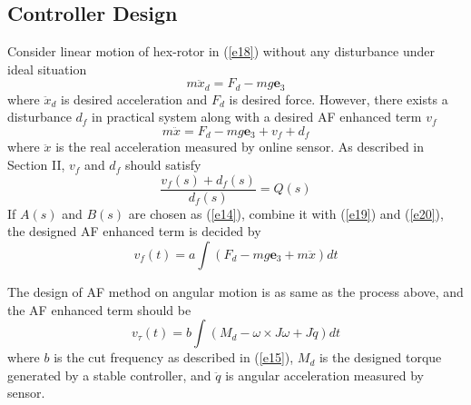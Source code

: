 \documentclass[letterpaper, 10 pt, conference]{ieeeconf}  %
\begin{document}
\subsection{Controller Design}

Consider linear motion of hex-rotor in (\ref{e18}) without any disturbance under ideal situation
\begin{equation}
    m\ddot{x}_d = F_d - mg\bm{e}_3
    \label{e19}
\end{equation}
where $\ddot{x}_d$ is desired acceleration and $F_d$ is desired force. However, there exists a disturbance $d_f$ in practical system along with a desired AF enhanced term $v_f$
\begin{equation}
    m\ddot{x} = F_d - mg\bm{e}_3 + v_f + d_f
    \label{e20}
\end{equation}
where $\ddot{x}$ is the real acceleration measured by online sensor.
As described in Section II, $v_f$ and $d_f$ should satisfy
\begin{equation}
    \frac{v_f(s)+d_f(s)}{d_f(s)} = Q(s)
    \label{e21}
\end{equation}
If $A(s)$ and $B(s)$ are chosen as (\ref{e14}), combine it with (\ref{e19}) and (\ref{e20}), the designed AF enhanced term is decided by
\begin{equation}
    v_f(t) = a\int (F_d - mg\bm{e}_3 + m\ddot{x})dt 
    \label{e22}
\end{equation}

The design of AF method on angular motion is as same as the process above, and the AF enhanced term should be
\begin{equation}
    v_\tau(t) = b\int (M_d - \omega\times J\omega + J\ddot{q})dt
    \label{e23}
\end{equation}
where $b$ is the cut frequency as described in (\ref{e15}), $M_d$ is the designed torque generated by a stable controller, and $\ddot{q}$ is angular acceleration measured by sensor.
\end{document}
